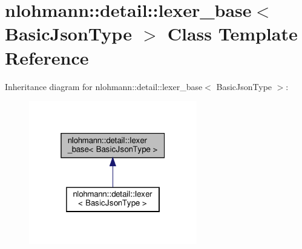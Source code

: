 \hypertarget{classnlohmann_1_1detail_1_1lexer__base}{}\section{nlohmann\+:\+:detail\+:\+:lexer\+\_\+base$<$ Basic\+Json\+Type $>$ Class Template Reference}
\label{classnlohmann_1_1detail_1_1lexer__base}


Inheritance diagram for nlohmann\+:\+:detail\+:\+:lexer\+\_\+base$<$ Basic\+Json\+Type $>$\+:
\nopagebreak
\begin{figure}[H]
\begin{center}
\leavevmode
\includegraphics[width=208pt]{classnlohmann_1_1detail_1_1lexer__base__inherit__graph}
\end{center}
\end{figure}
